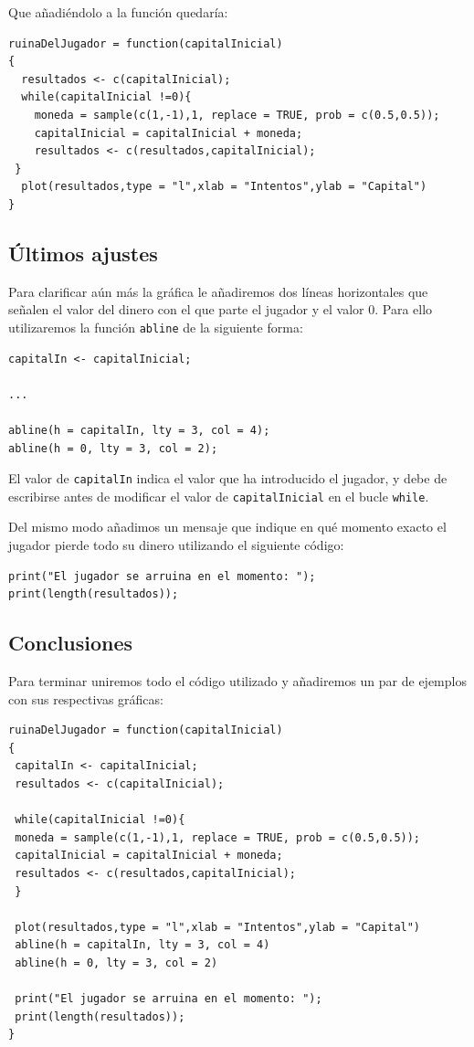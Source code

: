\documentclass[10pt,a4paper]{article}
\begin{document}
Que añadiéndolo a la función quedaría:

\begin{verbatim}
ruinaDelJugador = function(capitalInicial)
{
  resultados <- c(capitalInicial);
  while(capitalInicial !=0){
    moneda = sample(c(1,-1),1, replace = TRUE, prob = c(0.5,0.5));
    capitalInicial = capitalInicial + moneda;
    resultados <- c(resultados,capitalInicial);
 }
  plot(resultados,type = "l",xlab = "Intentos",ylab = "Capital")
}
\end{verbatim}

\subsection{Últimos ajustes}
Para clarificar aún más la gráfica le añadiremos dos líneas horizontales que señalen el valor del dinero con el que parte el jugador y el valor 0. Para ello utilizaremos la función {\tt abline} de la siguiente forma:

\begin{verbatim}
capitalIn <- capitalInicial;

...

abline(h = capitalIn, lty = 3, col = 4);
abline(h = 0, lty = 3, col = 2);
\end{verbatim}

El valor de {\tt capitalIn} indica el valor que ha introducido el jugador, y debe de escribirse antes de modificar el valor de {\tt capitalInicial} en el bucle {\tt while}.

Del mismo modo añadimos un mensaje que indique en qué momento exacto el jugador pierde todo su dinero utilizando el siguiente código:

\begin{verbatim}
print("El jugador se arruina en el momento: ");
print(length(resultados));
\end{verbatim}
\subsection{Conclusiones}
Para terminar uniremos todo el código utilizado y añadiremos un par de ejemplos con sus respectivas gráficas:

\begin{verbatim}
ruinaDelJugador = function(capitalInicial)
{
 capitalIn <- capitalInicial;
 resultados <- c(capitalInicial);

 while(capitalInicial !=0){
 moneda = sample(c(1,-1),1, replace = TRUE, prob = c(0.5,0.5));
 capitalInicial = capitalInicial + moneda;
 resultados <- c(resultados,capitalInicial);
 }

 plot(resultados,type = "l",xlab = "Intentos",ylab = "Capital")
 abline(h = capitalIn, lty = 3, col = 4)
 abline(h = 0, lty = 3, col = 2)

 print("El jugador se arruina en el momento: ");
 print(length(resultados));
}
\end{verbatim}
\end{document}
